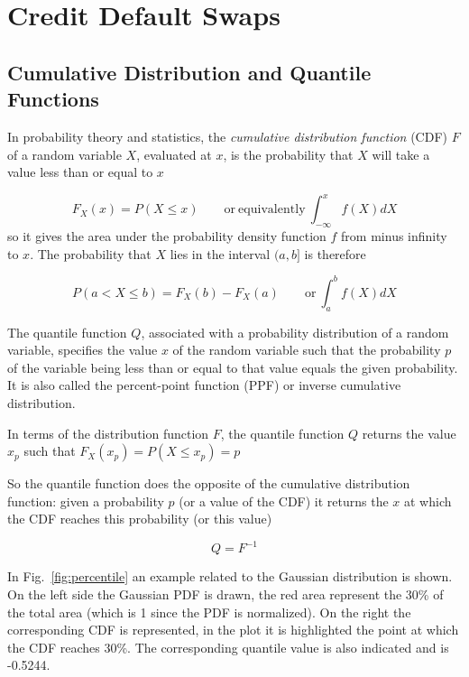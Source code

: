 \chapter{Credit Default Swaps}\label{credit_default_swaps}

\section{Cumulative Distribution and Quantile Functions}\label{quantile-function}

In probability theory and statistics, the \emph{cumulative distribution function} (CDF) \(F\) of a random variable \(X\), evaluated at \(x\), is the probability that \(X\) will take a value less than or equal to \(x\)

\begin{equation}F_X(x) = P(X \le x)\qquad\mathrm{or~equivalently}~\int_{-\infty}^{x}{f(X)dX}\end{equation}
so it gives the area under the probability density function \(f\) from
minus infinity to \(x\).
The probability that \(X\) lies in the interval \((a,b]\) is therefore

\begin{equation}
P(a\lt X \le b)=F_{X}(b)-F_{X}(a)\qquad\mathrm{or}~\int_a^b{f(X)dX}\end{equation}

The quantile function $Q$, associated with a probability distribution of a random variable, specifies the value $x$ of the random variable such that the probability $p$ of the variable being less than or equal to that value equals the given probability. It is also called the percent-point function (PPF) or inverse cumulative distribution.

In terms of the distribution function \(F\), the quantile function \(Q\)
returns the value \(x_p\) such that $F_{X}(x_p)=P(X\le x_p)=p$

So the quantile function does the opposite of the cumulative
distribution function: given a probability \(p\) (or a value of the CDF)
it returns the \(x\) at which the CDF reaches this probability (or this
value) 

\begin{equation}Q=F^{-1}\end{equation}

In Fig.~\ref{fig:percentile} an example related to the
Gaussian distribution is shown. On the left side the Gaussian PDF is drawn,
the red area represent the 30\% of the total area (which is 1 since the
PDF is normalized). On the right the corresponding CDF is represented,
in the plot it is highlighted the point at which the CDF reaches
30\%. The corresponding quantile value is also indicated and is -0.5244.

